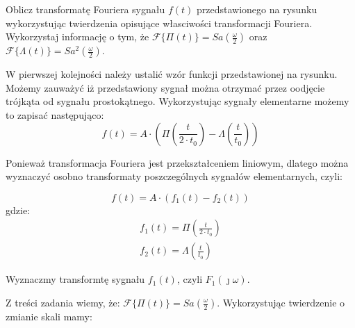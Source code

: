 \begin{task}
Oblicz transformatę Fouriera sygnału $f(t)$ przedstawionego na rysunku wykorzystując twierdzenia opisujące własciwości transformacji Fouriera.
Wykorzystaj informację o tym, że $\mathcal F\{\Pi(t)\}=Sa\left(\frac{\omega}{2}\right)$ oraz $\mathcal F\{\Lambda(t)\}=Sa^2\left(\frac{\omega}{2}\right)$.

\begin{figure}[H]
  \centering
\end{figure}

W pierwszej kolejności należy ustalić wzór funkcji przedstawionej na rysunku. Możemy zauważyć iż przedstawiony sygnał można otrzymać przez oodjęcie trójkąta od sygnału prostokątnego. 
Wykorzystując sygnały elementarne możemy to zapisać następująco:
\begin{equation}
f(t) = A \cdot \left(\Pi\left(\frac{t}{2\cdot t_{0}}\right) - \Lambda\left(\frac{t}{t_{0}}\right)\right)
\end{equation}

Ponieważ transformacja Fouriera jest przekształceniem liniowym, dlatego można wyznaczyć osobno transformaty poszczególnych sygnałów elementarnych, czyli:

\begin{equation}
f(t) = A\cdot \left( f_{1}(t) - f_{2}(t) \right)
\end{equation}
gdzie:
\begin{align*}
f_{1}(t) = \Pi\left(\frac{t}{2\cdot t_{0}}\right)\\
f_{2}(t) = \Lambda\left(\frac{t}{t_{0}}\right)
\end{align*}

Wyznaczmy transformtę sygnału $f_{1}(t)$, czyli $F_{1}(\jmath \omega)$.

Z treści zadania wiemy, że:
$\mathcal F \{\Pi(t)\} = Sa\left(\frac{\omega}{2}\right)$. Wykorzystując twierdzenie o zmianie skali mamy:


\end{task}
